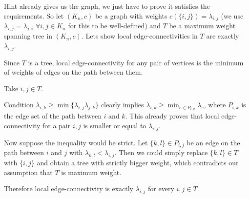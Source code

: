 \newcommand{\sheet}{7}




\maketitle

\begin{exercise}{1}
    Hint already gives us the graph, we just have to prove it satisfies the
    requirements. So let $(K_n, c)$ be a graph with weights $c(\{i, j\}) =
    \lambda_{i, j}$ (we use $\lambda_{i, j} = \lambda_{j, i}$ $\forall i, j \in
    K_n$ for this to be well-defined) and $T$ be a maximum weight spanning tree
    in $(K_n, c)$. Lets show local edge-connectivities in $T$ are exactly
    $\lambda_{i, j}$.

    Since $T$ is a tree, local edge-connectivity for any pair of vertices is the
    minimum of weights of edges on the path between them.

    Take $i, j \in T$.

    Condition $\lambda_{i, k} \geq \min\{\lambda_{i, j} \lambda_{j, k}\}$
    clearly implies $\lambda_{i, k} \geq \min_{e \in P_{i, k}} \lambda_e$, where
    $P_{i, k}$ is the edge set of the path between $i$ and $k$. This already
    proves that local edge-connectivity for a pair $i, j$ is smaller or equal to
    $\lambda_{i, j}$.

    Now suppose the inequality would be strict. Let $\{k, l\} \in P_{i, j}$ be
    an edge on the path between $i$ and $j$ with $\lambda_{k, l} < \lambda_{i,
    j}$. Then we could simply replace $\{k, l\} \in T$ with $\{i, j\}$ and
    obtain a tree with strictly bigger weight, which contradicts our assumption
    that $T$ is maximum weight.

    Therefore local edge-connectivity is exactly $\lambda_{i, j}$ for every $i,
    j \in T$.
\end{exercise}


